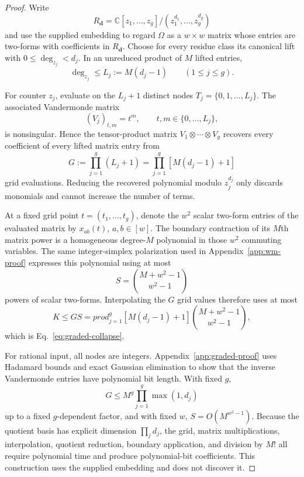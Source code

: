\documentclass[aps,pra,reprint,superscriptaddress,nofootinbib,longbibliography,showkeys]{revtex4-2}
\theoremstyle{definition}
\begin{document}
\begin{proof}
Write
\begin{equation}
R_{\boldsymbol d}=\mathbb C[z_1,\ldots,z_g]/
(z_1^{d_1},\ldots,z_g^{d_g})
\end{equation}
and use the supplied embedding to regard $\Omega$ as a $w\times w$ matrix
whose entries are two-forms with coefficients in $R_{\boldsymbol d}$.  Choose
for every residue class its canonical lift with
$0\le\deg_{z_j}<d_j$.  In an unreduced product of $M$ lifted entries,
\begin{equation}
\deg_{z_j}\le L_j:=M(d_j-1)\qquad(1\le j\le g).
\label{eq:audit-graded-degree}
\end{equation}

For counter $z_j$, evaluate on the $L_j+1$ distinct nodes
$T_j=\{0,1,\ldots,L_j\}$.  The associated Vandermonde matrix
\begin{equation}
(V_j)_{t,m}=t^m,\qquad t,m\in\{0,\ldots,L_j\},
\end{equation}
is nonsingular.  Hence the tensor-product matrix
$V_1\otimes\cdots\otimes V_g$ recovers every coefficient of every lifted
matrix entry from
\begin{equation}
G:=\prod_{j=1}^g(L_j+1)
=\prod_{j=1}^g[M(d_j-1)+1]
\label{eq:audit-graded-grid}
\end{equation}
grid evaluations.  Reducing the recovered polynomial modulo
$z_j^{d_j}$ only discards monomials and cannot increase the number of terms.

At a fixed grid point $t=(t_1,\ldots,t_g)$, denote the $w^2$ scalar two-form
entries of the evaluated matrix by $x_{ab}(t)$, $a,b\in[w]$.  The boundary
contraction of its $M$th matrix power is a homogeneous degree-$M$ polynomial
in those $w^2$ commuting variables.  The same integer-simplex polarization
used in Appendix~\ref{app:wm-proof} expresses this polynomial using at most
\begin{equation}
S=\binom{M+w^2-1}{w^2-1}
\end{equation}
powers of scalar two-forms.  Interpolating the $G$ grid values therefore uses
at most
\begin{equation}
K\le GS=prod_{j=1}^g[M(d_j-1)+1]
\binom{M+w^2-1}{w^2-1},
\end{equation}
which is Eq.~\eqref{eq:graded-collapse}.

For rational input, all nodes are integers.  Appendix~\ref{app:graded-proof}
uses Hadamard bounds and exact Gaussian elimination to show that the inverse
Vandermonde entries have polynomial bit length.  With fixed $g$,
\begin{equation}
G\le M^g\prod_{j=1}^g\max(1,d_j)
\end{equation}
up to a fixed $g$-dependent factor, and with fixed $w$,
$S=O(M^{w^2-1})$.  Because the quotient basis has explicit dimension
$\prod_jd_j$, the grid, matrix multiplications, interpolation, quotient
reduction, boundary application, and division by $M!$ all require polynomial
time and produce polynomial-bit coefficients.  This construction uses the
supplied embedding and does not discover it.
\end{proof}
\end{document}
